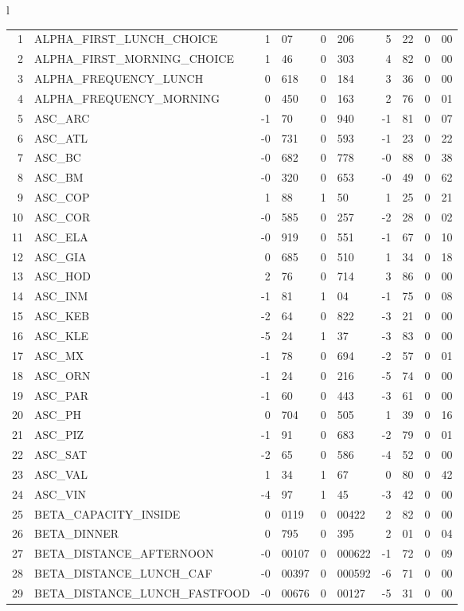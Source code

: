 \begin{tabular}{l}
\begin{tabular}{rlr@{.}lr@{.}lr@{.}lr@{.}l}
1 & ALPHA_FIRST_LUNCH_CHOICE & 1&07 & 0&206 & 5&22 & 0&00\\
2 & ALPHA_FIRST_MORNING_CHOICE & 1&46 & 0&303 & 4&82 & 0&00\\
3 & ALPHA_FREQUENCY_LUNCH & 0&618 & 0&184 & 3&36 & 0&00\\
4 & ALPHA_FREQUENCY_MORNING & 0&450 & 0&163 & 2&76 & 0&01\\
5 & ASC_ARC & -1&70 & 0&940 & -1&81 & 0&07\\
6 & ASC_ATL  & -0&731 & 0&593 & -1&23 & 0&22\\
7 & ASC_BC & -0&682 & 0&778 & -0&88 & 0&38\\
8 & ASC_BM  & -0&320 & 0&653 & -0&49 & 0&62\\
9 & ASC_COP & 1&88 & 1&50 & 1&25 & 0&21\\
10 & ASC_COR  & -0&585 & 0&257 & -2&28 & 0&02\\
11 & ASC_ELA  & -0&919 & 0&551 & -1&67 & 0&10\\
12 & ASC_GIA  & 0&685 & 0&510 & 1&34 & 0&18\\
13 & ASC_HOD  & 2&76 & 0&714 & 3&86 & 0&00\\
14 & ASC_INM  & -1&81 & 1&04 & -1&75 & 0&08\\
15 & ASC_KEB  & -2&64 & 0&822 & -3&21 & 0&00\\
16 & ASC_KLE & -5&24 & 1&37 & -3&83 & 0&00\\
17 & ASC_MX  & -1&78 & 0&694 & -2&57 & 0&01\\
18 & ASC_ORN  & -1&24 & 0&216 & -5&74 & 0&00\\
19 & ASC_PAR  & -1&60 & 0&443 & -3&61 & 0&00\\
20 & ASC_PH  & 0&704 & 0&505 & 1&39 & 0&16\\
21 & ASC_PIZ  & -1&91 & 0&683 & -2&79 & 0&01\\
22 & ASC_SAT  & -2&65 & 0&586 & -4&52 & 0&00\\
23 & ASC_VAL  & 1&34 & 1&67 & 0&80 & 0&42\\
24 & ASC_VIN & -4&97 & 1&45 & -3&42 & 0&00\\
25 & BETA_CAPACITY_INSIDE & 0&0119 & 0&00422 & 2&82 & 0&00\\
26 & BETA_DINNER & 0&795 & 0&395 & 2&01 & 0&04\\
27 & BETA_DISTANCE_AFTERNOON & -0&00107 & 0&000622 & -1&72 & 0&09\\
28 & BETA_DISTANCE_LUNCH_CAF & -0&00397 & 0&000592 & -6&71 & 0&00\\
29 & BETA_DISTANCE_LUNCH_FASTFOOD & -0&00676 & 0&00127 & -5&31 & 0&00\\

\end{tabular}
\end{tabular}
